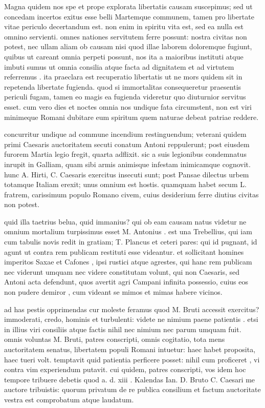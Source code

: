  Magna quidem nos spe et prope explorata libertatis causam suscepimus; sed ut concedam incertos exitus esse belli Martemque communem, tamen pro libertate vitae periculo decertandum est. non enim in spiritu vita est, sed ea nulla est omnino servienti. omnes nationes servitutem ferre possunt: nostra civitas non potest, nec ullam aliam ob causam nisi quod illae laborem doloremque fugiunt, quibus ut careant omnia perpeti possunt, nos ita a maioribus instituti atque imbuti sumus ut omnia consilia atque facta ad dignitatem et ad virtutem referremus . ita praeclara est recuperatio libertatis ut ne mors quidem sit in repetenda libertate fugienda. quod si immortalitas consequeretur praesentis periculi fugam, tamen eo magis ea fugienda videretur quo diuturnior servitus esset. cum vero dies et noctes omnia nos undique fata circumstent, non est viri minimeque Romani dubitare eum spiritum quem naturae debeat patriae reddere.

 concurritur undique ad commune incendium restinguendum; veterani quidem primi Caesaris auctoritatem secuti conatum Antoni reppulerunt; post eiusdem furorem Martia legio fregit, quarta adflixit. sic a suis legionibus condemnatus inrupit in Galliam, quam sibi armis animisque infestam inimicamque cognovit. hunc A. Hirti, C. Caesaris exercitus insecuti sunt; post Pansae dilectus urbem totamque Italiam erexit; unus omnium est hostis. quamquam habet secum L. fratrem, carissimum populo Romano civem, cuius desiderium ferre diutius civitas non potest.

 quid illa taetrius belua, quid immanius? qui ob eam causam natus videtur ne omnium mortalium turpissimus esset M. Antonius . est una Trebellius, qui iam cum tabulis novis redit in gratiam; T. Plancus et ceteri pares: qui id pugnant, id agunt ut contra rem publicam restituti esse videantur. et sollicitant homines imperitos Saxae et Cafones , ipsi rustici atque agrestes, qui hanc rem publicam nec viderunt umquam nec videre constitutam volunt, qui non Caesaris, sed Antoni acta defendunt, quos avertit agri Campani infinita possessio, cuius eos non pudere demiror , cum videant se mimos et mimas habere vicinos.

 ad has pestis opprimendas cur moleste feramus quod M. Bruti accessit exercitus? immoderati, credo, hominis et turbulenti: videte ne nimium paene patientis . etsi in illius viri consiliis atque factis nihil nec nimium nec parum umquam fuit. omnis voluntas M. Bruti, patres conscripti, omnis cogitatio, tota mens auctoritatem senatus, libertatem populi Romani intuetur: haec habet proposita, haec tueri volt. temptavit quid patientia perficere posset: nihil cum proficeret , vi contra vim experiendum putavit. cui quidem, patres conscripti, vos idem hoc tempore tribuere debetis quod a. d. xiii . Kalendas Ian. D. Bruto C. Caesari me auctore tribuistis: quorum privatum de re publica consilium et factum auctoritate vestra est comprobatum atque laudatum.

